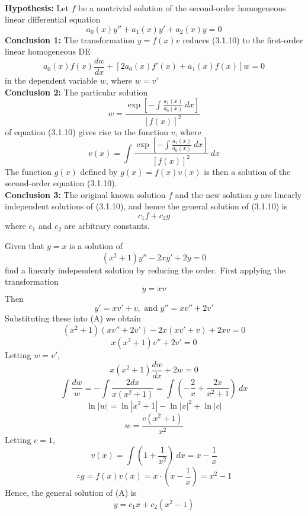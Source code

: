 \begin{theorem}{}{} \label{th3.1.8}
    \\\textbf{Hypothesis:} Let $f$ be a nontrivial solution of the second-order homogeneous linear differential equation
    \begin{equation}
        a_0(x)y'' + a_1(x)y' + a_2(x)y = 0
    \end{equation}
    \textbf{Conclusion 1:} The transformation $y = f(x)v$ reduces (3.1.10) to the first-order linear homogeneous DE \[
        a_0(x)f(x)\frac{dw}{dx} + [ 2a_0(x)f'(x) + a_1(x)f(x) ]w = 0
    \] in the dependent variable $w$, where $w = v'$ \\
    \textbf{Conclusion 2:} The particular solution \[
        w = \frac{\exp\left[ -\int{ \frac{a_1(x)}{a_0(x)} } \: d{x} \right]}{[f(x)]^2}
    \] of equation (3.1.10) gives rise to the function $v$, where \[
    v(x) = \int{ \frac{\exp\left[ -\int{\frac{a_1(x)}{a_0(x)}} \: d{x} \right]}{[f(x)]^2} } \: d{x}
    \] The function $g(x)$ defined by $g(x) = f(x)v(x)$ is then a solution of the second-order equation (3.1.10). \\
    \textbf{Conclusion 3:} The original known solution $f$ and the new solution $g$ are linearly independent solutions of (3.1.10), and hence the general solution of (3.1.10) is \[
        c_1f + c_2g
    \] where $c_1$ and $c_2$ are arbitrary constants.
\end{theorem}

\begin{example}{
        Given that $y=x$ is a solution of
        \begin{equation}\tag{A}
            (x^2+1)y'' - 2xy' + 2y = 0
        \end{equation}
        find a linearly independent solution by reducing the order.
    }{}
    First applying the transformation \[
        y = xv
    \] Then \[
        y' = xv' + v, \text{ and } y'' = xv'' + 2v'
    \] Substituting these into (A) we obtain \[
    (x^2+1)(xv''+2v') - 2x(xv'+v) + 2xv = 0
    \] \[ x(x^2+1)v'' + 2v' = 0 \]
    Letting $w = v'$,
    \[ x(x^2+1)\frac{dw}{dx} + 2w = 0 \]
    \[ \int{\frac{dw}{w}} = -\int{\frac{2dx}{x(x^2+1)}} = \int{\left( -\frac{2}{x} + \frac{2x}{x^2+1} \right)} \: d{x} \]
    \[ \ln|w| = \ln|x^2+1| - \ln|x|^2 + \ln|c| \]
    \[ w = \frac{c(x^2+1)}{x^2} \]
    Letting $c = 1$,
    \[ v(x) = \int{\left( 1 + \frac{1}{x^2} \right)} \: d{x} = x - \frac{1}{x} \]
    \[ \therefore g = f(x)v(x) = x\cdot\left( x-\frac{1}{x} \right) = x^2-1 \]
    Hence, the general solution of (A) is \[
        \boxed{ y = c_1x + c_2(x^2-1) }
    \]
\end{example}


